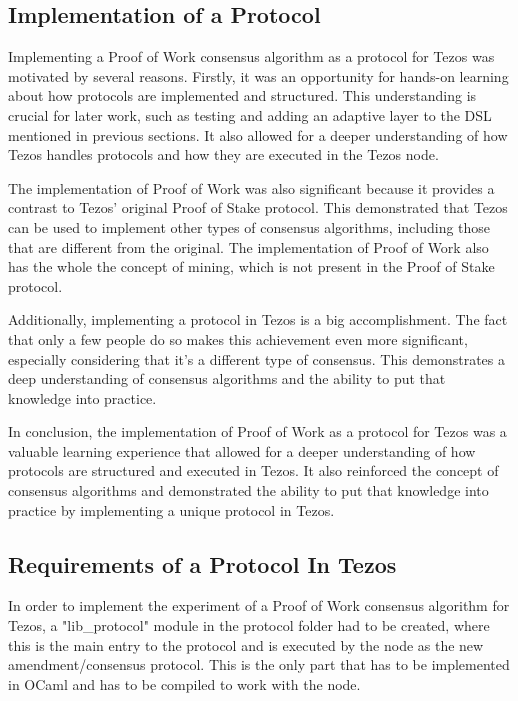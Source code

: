 \subsection*{\textbf{Implementation of a Protocol}}

Implementing a Proof of Work consensus algorithm as a protocol for Tezos was motivated by several reasons. Firstly, it was an opportunity for hands-on learning about how protocols are implemented and structured. This understanding is crucial for later work, such as testing and adding an adaptive layer to the DSL mentioned in previous sections. It also allowed for a deeper understanding of how Tezos handles protocols and how they are executed in the Tezos node.

The implementation of Proof of Work was also significant because it provides a contrast to Tezos' original Proof of Stake protocol. This demonstrated that Tezos can be used to implement other types of consensus algorithms, including those that are different from the original. The implementation of Proof of Work also has the whole the concept of mining, which is not present in the Proof of Stake protocol.

Additionally, implementing a protocol in Tezos is a big accomplishment. The fact that only a few people do so makes this achievement even more significant, especially considering that it's a different type of consensus. This demonstrates a deep understanding of consensus algorithms and the ability to put that knowledge into practice.

In conclusion, the implementation of Proof of Work as a protocol for Tezos was a valuable learning experience that allowed for a deeper understanding of how protocols are structured and executed in Tezos. It also reinforced the concept of consensus algorithms and demonstrated the ability to put that knowledge into practice by implementing a unique protocol in Tezos.


\subsection*{Requirements of a Protocol In Tezos}
In order to implement the experiment of a Proof of Work consensus algorithm for Tezos, a "lib\_protocol" module in the protocol folder had to be created, where this is the main entry to the protocol and is executed by the node as the new amendment/consensus protocol. This is the only part that has to be implemented in OCaml and has to be compiled to work with the node.

